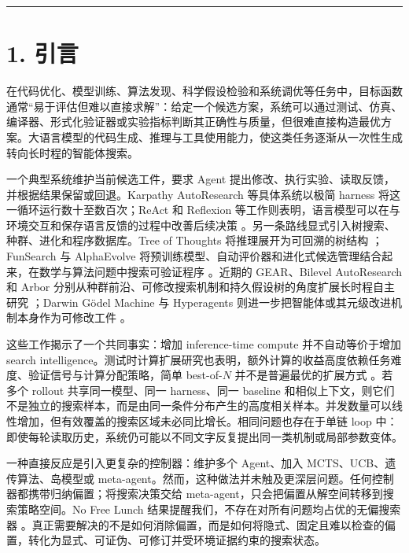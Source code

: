 \documentclass[
  11pt]{ctexart}
\begin{document}
\begin{center}\rule{0.5\linewidth}{0.5pt}\end{center}

\section{1. 引言}\label{ux5f15ux8a00}

在代码优化、模型训练、算法发现、科学假设检验和系统调优等任务中，目标函数通常``易于评估但难以直接求解''：给定一个候选方案，系统可以通过测试、仿真、编译器、形式化验证器或实验指标判断其正确性与质量，但很难直接构造最优方案。大语言模型的代码生成、推理与工具使用能力，使这类任务逐渐从一次性生成转向长时程的智能体搜索。

一个典型系统维护当前候选工件，要求 Agent
提出修改、执行实验、读取反馈，并根据结果保留或回退。Karpathy
AutoResearch 等具体系统以极简 harness 将这一循环运行数十至数百次；ReAct
和 Reflexion
等工作则表明，语言模型可以在与环境交互和保存语言反馈的过程中改善后续决策
\cite{yao2023react,shinn2023reflexion,karpathy2026autoresearch}。另一条路线显式引入树搜索、种群、进化和程序数据库。Tree
of Thoughts 将推理展开为可回溯的树结构
\cite{yao2023tot}；FunSearch 与 AlphaEvolve
将预训练模型、自动评价器和进化式候选管理结合起来，在数学与算法问题中搜索可验证程序
\cite{romeraparedes2024funsearch,novikov2025alphaevolve}。近期的
GEAR、Bilevel AutoResearch 和 Arbor
分别从种群前沿、可修改搜索机制和持久假设树的角度扩展长时程自主研究
\cite{jeddi2026gear,qu2026bilevel,jin2026arbor}；Darwin
Gödel Machine 与 Hyperagents
则进一步把智能体或其元级改进机制本身作为可修改工件
\cite{zhang2025dgm,zhang2026hyperagents}。

这些工作揭示了一个共同事实：增加 inference-time compute
并不自动等价于增加 search
intelligence。测试时计算扩展研究也表明，额外计算的收益高度依赖任务难度、验证信号与计算分配策略，简单
best-of-\(N\) 并不是普遍最优的扩展方式
\cite{snell2024testtime}。若多个 rollout
共享同一模型、同一 harness、同一 baseline
和相似上下文，则它们不是独立的搜索样本，而是由同一条件分布产生的高度相关样本。并发数量可以线性增加，但有效覆盖的搜索区域未必同比增长。相同问题也存在于单链
loop
中：即使每轮读取历史，系统仍可能以不同文字反复提出同一类机制或局部参数变体。

一种直接反应是引入更复杂的控制器：维护多个 Agent、加入
MCTS、UCB、遗传算法、岛模型或
meta-agent。然而，这种做法并未触及更深层问题。任何控制器都携带归纳偏置；将搜索决策交给
meta-agent，只会把偏置从解空间转移到搜索策略空间。No Free Lunch
结果提醒我们，不存在对所有问题均占优的无偏搜索器
\cite{wolpert1997nfl}。真正需要解决的不是如何消除偏置，而是如何将隐式、固定且难以检查的偏置，转化为显式、可证伪、可修订并受环境证据约束的搜索状态。
\end{document}
